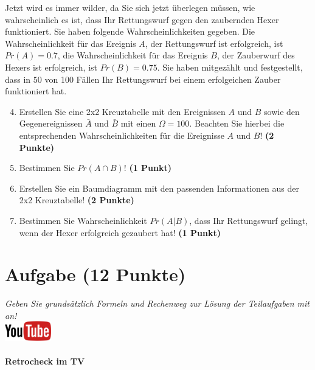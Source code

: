 \documentclass[a4paper, 9pt]{scrartcl}\usepackage[]{graphicx}\usepackage[]{xcolor}
\begin{document}
Jetzt wird es immer wilder, da Sie sich jetzt {\"u}berlegen m{\"u}ssen, wie
wahrscheinlich es ist, dass Ihr Rettungswurf gegen den zaubernden Hexer
funktioniert. Sie haben folgende Wahrscheinlichkeiten gegeben. Die
Wahrscheinlichkeit f{\"u}r das Ereignis $A$, der Rettungswurf ist erfolgreich,
ist $Pr(A) = 0.7$, die Wahrscheinlichkeit f{\"u}r das Ereignis $B$,
der Zauberwurf des Hexers ist erfolgreich, ist $Pr(B) = 0.75$. Sie
haben mitgez{\"a}hlt und festgestellt, dass in $50$ von 100 F{\"a}llen
Ihr Rettungswurf bei einem erfolgeichen Zauber funktioniert hat.  

\begin{enumerate}
  \setcounter{enumi}{3}
\item Erstellen Sie eine 2x2 Kreuztabelle mit den Ereignissen $A$ und $B$
  sowie den Gegenereignissen $\bar{A}$ und $\bar{B}$ mit einen
  $\Omega = 100$. Beachten Sie hierbei die entsprechenden
  Wahrscheinlichkeiten f{\"u}r die Ereignisse $A$ und $B$! \textbf{(2 Punkte)}
\item Bestimmen Sie $Pr(A \cap B)$! \textbf{(1 Punkt)}
\item Erstellen Sie ein Baumdiagramm mit den passenden Informationen aus der 2x2
  Kreuztabelle! \textbf{(2 Punkte)}
\item Bestimmen Sie Wahrscheinlichkeit $Pr(A|B)$, dass Ihr Rettungswurf gelingt, wenn
  der Hexer erfolgreich gezaubert hat! \textbf{(1 Punkt)}
\end{enumerate}

  
\clearpage

\section{Aufgabe \hfill (12 Punkte)}

\textit{Geben Sie grunds{\"a}tzlich Formeln und Rechenweg zur L{\"o}sung der
  Teilaufgaben mit an!} \\[1Ex]

\hfill\href{https://youtu.be/9DQKaXdxT_g}{\includegraphics[width =
  2cm]{img/youtube}} %
\hspace{2Ex}

\paragraph{Retrocheck im TV}
\end{document}
